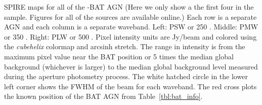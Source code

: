 \label{fig:example_maps} SPIRE maps for all of the \herschel-BAT AGN (Here we only show a the first four in the sample. Figures for all of the sources are available online.) Each row is a separate AGN and each column is a separate waveband. Left: PSW or 250 \um. Middle: PMW or 350 \um. Right: PLW or 500 \um. Pixel intensity units are Jy/beam and colored using the \textit{cubehelix} colormap \citep{Green:2011sp} and arcsinh stretch. The range in intensity is from the maximum pixel value near the BAT position or 5 times the median global background (whichever is larger) to the median global background level measured during the aperture photometry process.  The white hatched circle in the lower left corner shows the FWHM of the beam for each waveband. The red cross plots the known position of the BAT AGN from Table~\ref{tbl:bat_info}.
  
  